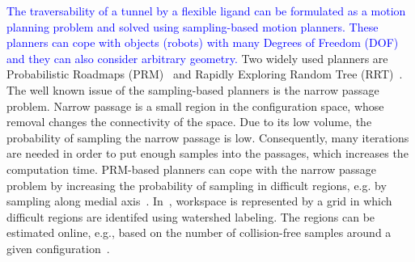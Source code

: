 \documentclass[usletter, 10pt, conference]{ieeeconf} %
\def\qrand{q_{rand}}
\def\qnear{q_{near}}
\def\qnew{q_{new}}
\def\T{\mathcal{T}}
\def\C{\mathcal{C}}
\begin{document}
{\textcolor{blue}{The traversability of a tunnel by a flexible ligand can be formulated as a motion planning problem and solved using
    sampling-based motion planners.
These planners can cope with objects (robots) with many Degrees of Freedom (DOF)  and they can also consider arbitrary geometry.}
Two widely used planners are Probabilistic Roadmaps (PRM)~\cite{kavrakiForPP} and Rapidly Exploring Random Tree (RRT)~\cite{lavalleRRT}.
The well known issue of the sampling-based planners is the narrow passage problem.
Narrow passage is a small region in the configuration space, whose removal changes the connectivity of the space.
Due to its low volume, the probability of sampling the narrow passage is low.
Consequently, many iterations are needed in order to put enough samples into the passages, which increases the computation time.
PRM-based planners can cope with the narrow passage problem by increasing the probability of sampling in difficult regions, e.g.
by sampling along medial axis~\cite{amatoOBRRT,amato2002using,wilmarthMAPRM}.
In~\cite{bergWIG}, workspace is represented by a grid in which difficult regions are identifed using watershed labeling.
The regions can be estimated online, e.g., based on the number of collision-free samples around a given configuration~\cite{overmarsGauss,hsuBridge}.

}
\end{document}
